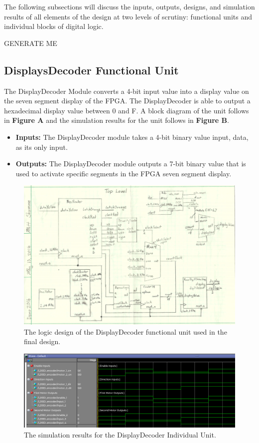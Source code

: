 \documentclass[a4paper]{article}
\begin{document}
The following subsections will discuss the inputs, outputs, designs, and simulation results of all elements of the design at two levels of scrutiny: functional units and individual blocks of digital logic.



\clearpage


GENERATE ME




\clearpage



\subsection{DisplaysDecoder Functional Unit}
The DisplayDecoder Module converts a 4-bit input value into a display value on the seven segment display of the FPGA. The DisplayDecoder is
able to output a hexadecimal display value between 0 and F. A block diagram of the unit follows in \textbf{Figure A} and the simulation results for the unit follows in \textbf{Figure B}.
\begin{itemize}
  \item \textbf{Inputs:  } The DisplayDecoder module takes a 4-bit binary value input, data, as its only input.
  \item \textbf{Outputs: } The DisplayDecoder module outputs a 7-bit binary value that is used to activate specific segments in the FPGA seven segment display.
\end{itemize}
\begin{figure}[h]
  \centering
    \includegraphics[width=.8\textwidth]{images/functional_1.png}
	\caption{The logic design of the DisplayDecoder functional unit used in the final design.}
    \label{fig:functional-1}
\end{figure}
\begin{figure}[h]
  \centering
    \includegraphics[width=.98\textwidth]{sims/functional_1.png}
	\caption{The simulation results for the DisplayDecoder Individual Unit.}
    \label{fig:top-level-sim}
\end{figure}
\end{document}
